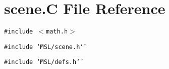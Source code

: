 \section{scene.C File Reference}
\label{scene_8C}
{\tt \#include $<$math.h$>$}\par
{\tt \#include \char`\"{}MSL/scene.h\char`\"{}}\par
{\tt \#include \char`\"{}MSL/defs.h\char`\"{}}\par
